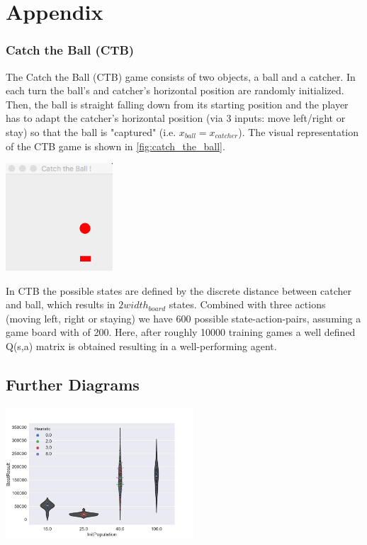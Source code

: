 \section*{Appendix}
\label{sec:appendix}

\subsubsection*{Catch the Ball (CTB)}
The Catch the Ball (CTB) game consists of two objects, a ball and a catcher. In each turn the ball's and catcher's horizontal position are randomly initialized. Then, the ball is straight falling down from its starting position and the player has to adapt the catcher's horizontal position (via 3 inputs: move left/right or stay) so that the ball is "captured" (i.e. $x_{ball} = x_{catcher}$). The visual representation of the CTB game is shown in \ref{fig:catch_the_ball}. 

\begin{Figure}
\begin{center}
\includegraphics[width=4cm]{imgs/catch_the_ball.png}
\end{center}
\label{fig:catch_the_ball}
\end{Figure}

In CTB the possible states are defined by the discrete distance between catcher and ball, which results in $2 width_{board}$ states. Combined with three actions (moving left, right or staying) we have 600 possible state-action-pairs, assuming a game board with of 200. Here, after roughly 10000 training games a well defined Q(s,a) matrix is obtained resulting in a well-performing agent.

\subsection*{Further Diagrams}


\begin{Figure}
\begin{center}
\includegraphics[width=7cm]{imgs/InitPop_Best.png}
\end{center}
\label{fig:initpop_best}
\end{Figure}